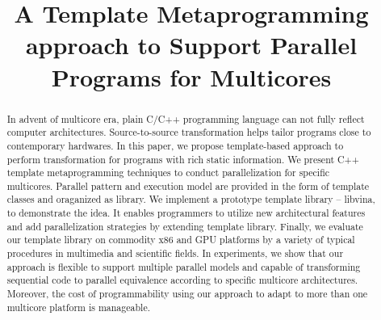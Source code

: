 \documentclass[conference]{IEEEtran}
\begin{document}
\title{A Template Metaprogramming approach to Support Parallel
  Programs for Multicores}


\author{
}

\maketitle


\begin{abstract}
In advent of multicore era, plain C/C++ programming language can not
fully reflect computer architectures. Source-to-source
transformation helps tailor programs close to contemporary
hardwares. In this paper, we propose template-based approach to perform 
transformation for programs with rich static information.
We present C++ template metaprogramming techniques to conduct
parallelization for specific
multicores. Parallel pattern and execution model are provided in the form of
template classes and oraganized as library. We implement a prototype
template library -- libvina, to demonstrate the idea. It enables
programmers to utilize new architectural
features and add parallelization strategies by extending template library. 
Finally, we evaluate our template library on
commodity x86 and GPU platforms by a variety of typical procedures
in multimedia and scientific fields. In experiments, we show that our
approach is flexible to support multiple parallel models and capable
of transforming sequential code to parallel equivalence  according to
specific multicore architectures. Moreover, the cost of programmability using our
approach to adapt to more than one multicore platform is manageable.
\end{abstract}

\IEEEpeerreviewmaketitle



%






%





\end{document}
